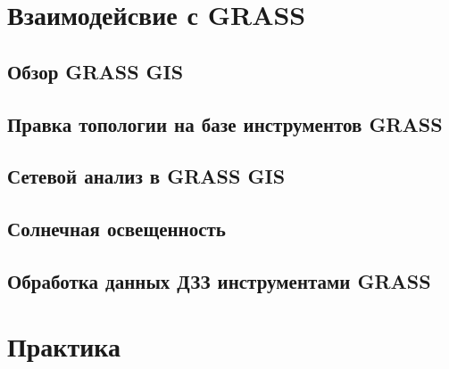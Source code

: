 \documentclass[ignorenonframetext,russian,hyperref={pdftex,unicode}]{beamer}        %
\begin{document}
\section{Взаимодейсвие с GRASS}
    \subsection{Обзор GRASS GIS}
    

    \subsection{Правка топологии на базе инструментов GRASS}
    

    \subsection{Сетевой анализ в GRASS GIS}
    

    \subsection{Солнечная освещенность}
    

    \subsection{Обработка данных ДЗЗ инструментами GRASS}
    







\section{Практика}
\end{document}
